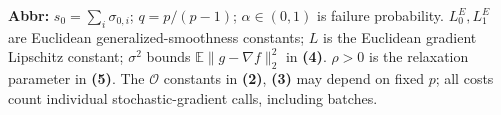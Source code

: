 \begin{table}[tp]
\begin{threeparttable}
\begin{tabularx}{\linewidth}{@{}>{\raggedright\arraybackslash}p{0.20\linewidth}>{\raggedright\arraybackslash}p{0.32\linewidth}>{\raggedright\arraybackslash}p{0.25\linewidth}>{\raggedright\arraybackslash}X@{}}
\bottomrule
\end{tabularx}
\begin{tablenotes}[flushleft]\footnotesize
\item[] \textbf{Abbr:} $s_0=\sum_i\sigma_{0,i}$; $q=p/(p-1)$; $\alpha\in(0,1)$ is failure probability.
$L_0^E,L_1^E$ are Euclidean generalized-smoothness constants; $L$ is the Euclidean gradient Lipschitz constant; $\sigma^2$ bounds $\mathbb E\|g-\nabla f\|_2^2$ in \textbf{(4)}.
$\rho>0$ is the relaxation parameter in \textbf{(5)}.
The $\mathcal O$ constants in \textbf{(2)}, \textbf{(3)} may depend on fixed $p$; all costs count individual stochastic-gradient calls, including batches.
\end{tablenotes}
\end{threeparttable}
\end{table}
